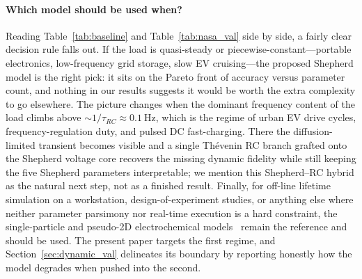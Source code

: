 \documentclass[5p,times,number]{elsarticle}
\newcommand{\tabref}[1]{\hyperref[#1]{\textup{Table~\ref*{#1}}}}
\newcommand{\secref}[1]{\hyperref[#1]{\textup{Section~\ref*{#1}}}}
\def\tabref#1{Table~\ref{#1}}
\def\secref#1{Section~\ref{#1}}
\begin{document}
\paragraph{Which model should be used when?}
Reading \tabref{tab:baseline} and \tabref{tab:nasa_val} side by side, a fairly clear decision rule falls out. If the load is quasi-steady or piecewise-constant---portable electronics, low-frequency grid storage, slow EV cruising---the proposed Shepherd model is the right pick: it sits on the Pareto front of accuracy versus parameter count, and nothing in our results suggests it would be worth the extra complexity to go elsewhere. The picture changes when the dominant frequency content of the load climbs above $\sim\!1/\tau_{RC} \approx \SI{0.1}{\hertz}$, which is the regime of urban EV drive cycles, frequency-regulation duty, and pulsed DC fast-charging. There the diffusion-limited transient becomes visible and a single Th\'{e}venin RC branch grafted onto the Shepherd voltage core recovers the missing dynamic fidelity while still keeping the five Shepherd parameters interpretable; we mention this Shepherd--RC hybrid as the natural next step, not as a finished result. Finally, for off-line lifetime simulation on a workstation, design-of-experiment studies, or anything else where neither parameter parsimony nor real-time execution is a hard constraint, the single-particle and pseudo-2D electrochemical models~\cite{Doyle1993,Mama2025} remain the reference and should be used. The present paper targets the first regime, and \secref{sec:dynamic_val} delineates its boundary by reporting honestly how the model degrades when pushed into the second.
\end{document}
